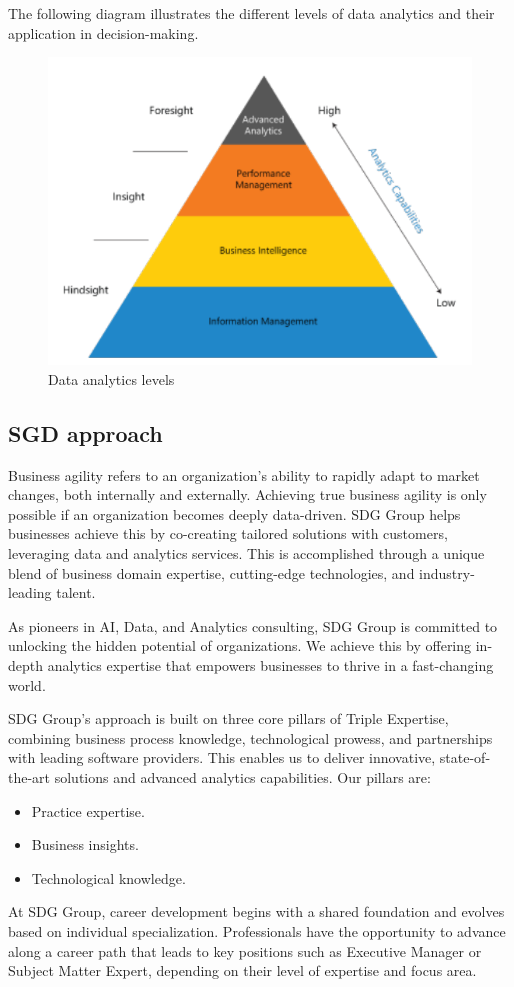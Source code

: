 The following diagram illustrates the different levels of data analytics and their application in decision-making.
\begin{figure}[H]
    \centering
    \includegraphics[width=0.5\linewidth]{images/bis8.png}
    \caption{Data analytics levels}
\end{figure}

\subsection{SGD approach}
Business agility refers to an organization's ability to rapidly adapt to market changes, both internally and externally. 
Achieving true business agility is only possible if an organization becomes deeply data-driven. 
SDG Group helps businesses achieve this by co-creating tailored solutions with customers, leveraging data and analytics services. 
This is accomplished through a unique blend of business domain expertise, cutting-edge technologies, and industry-leading talent.

As pioneers in AI, Data, and Analytics consulting, SDG Group is committed to unlocking the hidden potential of organizations. 
We achieve this by offering in-depth analytics expertise that empowers businesses to thrive in a fast-changing world.

SDG Group's approach is built on three core pillars of Triple Expertise, combining business process knowledge, technological prowess, and partnerships with leading software providers.
This enables us to deliver innovative, state-of-the-art solutions and advanced analytics capabilities. Our pillars are:
\begin{itemize}
    \item Practice expertise.
    \item Business insights.
    \item Technological knowledge.
\end{itemize}
\noindent At SDG Group, career development begins with a shared foundation and evolves based on individual specialization. 
Professionals have the opportunity to advance along a career path that leads to key positions such as Executive Manager or Subject Matter Expert, depending on their level of expertise and focus area.

